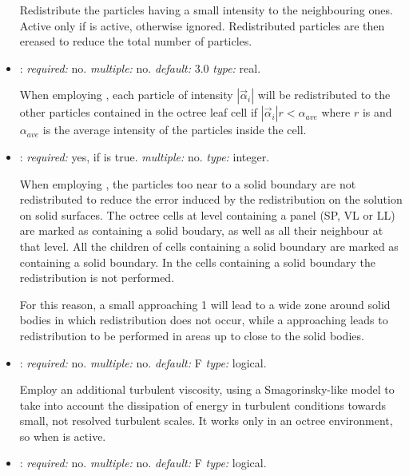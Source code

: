 \begin{itemize}
Redistribute the particles having a small intensity to the neighbouring ones. 
Active only if  is active, otherwise ignored. Redistributed particles 
are then ereased to reduce the total number of particles.

\item {}: \textit{required:} no. 
\textit{multiple:} no. \textit{default:} 3.0 \textit{type:} real.

When employing , each particle of intensity 
$|\vec{\alpha}_i|$ will be redistributed to the other particles contained 
in the octree leaf cell if $|\vec{\alpha}_i| r < \alpha_{ave}$ where $r$ is 
 and $\alpha_{ave}$ is the average 
intensity of the particles inside the cell.

\item {}: \textit{required:} yes, if 
 is true. \textit{multiple:} no. 
\textit{type:} integer.

When employing , the particles too near 
to a solid boundary are not redistributed to reduce the error induced by 
the redistribution on the solution on solid surfaces. The octree cells at 
level  containing a panel (SP, VL or LL) are marked 
as containing a solid boudary, as well as all their neighbour at that level. 
All the children of cells containing a solid boundary are marked as containing 
a solid boundary. In the cells containing a solid boundary the redistribution 
is not performed.

For this reason, a small  approaching 1 will lead 
to a wide zone around solid bodies in which redistribution does not occur, 
while a  approaching  leads 
to redistribution to be performed in areas up to close to the solid bodies.

\item {}: \textit{required:} no. \textit{multiple:} no. 
\textit{default:} F \textit{type:} logical.

Employ an additional turbulent viscosity, using a Smagorinsky-like model to 
take into account the dissipation of energy in turbulent conditions towards 
small, not resolved turbulent scales. It works only in an octree environment, 
so when  is active.

\item {}: \textit{required:} no. \textit{multiple:} no. 
\textit{default:} F \textit{type:} logical.


\end{itemize}
